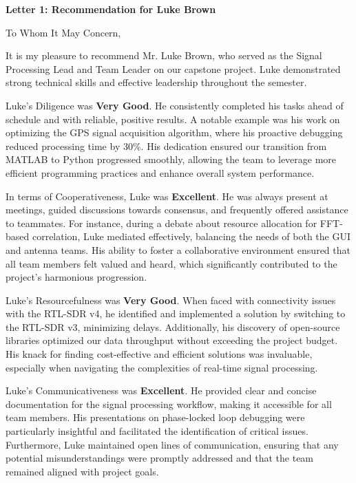 \documentclass[11pt]{article}
\begin{document}
\newpage

\begin{flushleft}
\textbf{Letter 1: Recommendation for Luke Brown}

\vspace{12pt}

To Whom It May Concern,

\vspace{12pt}

It is my pleasure to recommend Mr. Luke Brown, who served as the Signal Processing Lead and Team Leader on our capstone project. Luke demonstrated strong technical skills and effective leadership throughout the semester.

Luke’s Diligence was \textbf{Very Good}. He consistently completed his tasks ahead of schedule and with reliable, positive results. A notable example was his work on optimizing the GPS signal acquisition algorithm, where his proactive debugging reduced processing time by 30\%. His dedication ensured our transition from MATLAB to Python progressed smoothly, allowing the team to leverage more efficient programming practices and enhance overall system performance.

In terms of Cooperativeness, Luke was \textbf{Excellent}. He was always present at meetings, guided discussions towards consensus, and frequently offered assistance to teammates. For instance, during a debate about resource allocation for FFT-based correlation, Luke mediated effectively, balancing the needs of both the GUI and antenna teams. His ability to foster a collaborative environment ensured that all team members felt valued and heard, which significantly contributed to the project's harmonious progression.

Luke’s Resourcefulness was \textbf{Very Good}. When faced with connectivity issues with the RTL-SDR v4, he identified and implemented a solution by switching to the RTL-SDR v3, minimizing delays. Additionally, his discovery of open-source libraries optimized our data throughput without exceeding the project budget. His knack for finding cost-effective and efficient solutions was invaluable, especially when navigating the complexities of real-time signal processing.

Luke’s Communicativeness was \textbf{Excellent}. He provided clear and concise documentation for the signal processing workflow, making it accessible for all team members. His presentations on phase-locked loop debugging were particularly insightful and facilitated the identification of critical issues. Furthermore, Luke maintained open lines of communication, ensuring that any potential misunderstandings were promptly addressed and that the team remained aligned with project goals.


\end{flushleft}
\end{document}
